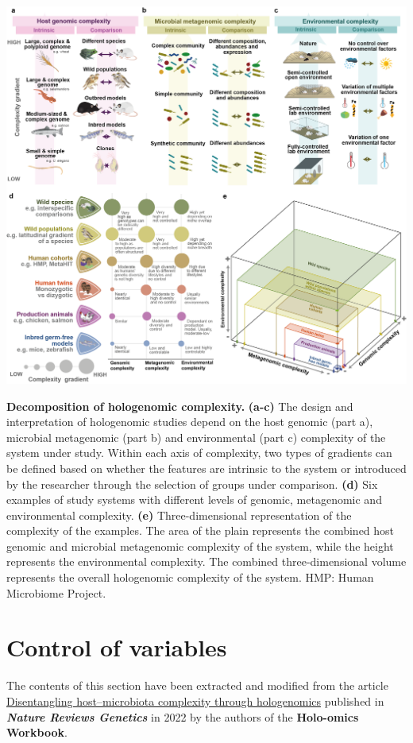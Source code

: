 \documentclass[
]{book}
\begin{document}
\includegraphics{images/holo-omics_complexity.png}

\textbf{Decomposition of hologenomic complexity.} \textbf{(a-c)} The design and interpretation of hologenomic studies depend on the host genomic (part a), microbial metagenomic (part b) and environmental (part c) complexity of the system under study. Within each axis of complexity, two types of gradients can be defined based on whether the features are intrinsic to the system or introduced by the researcher through the selection of groups under comparison. \textbf{(d)} Six examples of study systems with different levels of genomic, metagenomic and environmental complexity. \textbf{(e)} Three-dimensional representation of the complexity of the examples. The area of the plain represents the combined host genomic and microbial metagenomic complexity of the system, while the height represents the environmental complexity. The combined three-dimensional volume represents the overall hologenomic complexity of the system. HMP: Human Microbiome Project.

\hypertarget{control-of-variables}{%
\section{Control of variables}\label{control-of-variables}}

The contents of this section have been extracted and modified from the article \href{https://www.nature.com/articles/s41576-021-00421-0}{Disentangling host--microbiota complexity through hologenomics} published in \textbf{\emph{Nature Reviews Genetics}} in 2022 by the authors of the \textbf{Holo-omics Workbook}.
\end{document}
